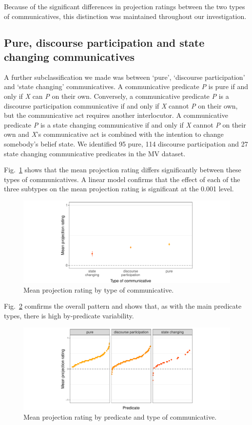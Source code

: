 \documentclass[11pt,fleqn]{article}
\newcommand{\figref}[1]{Fig.~\ref{#1}}
\newcommand{\6}{\mbox{$[\hspace*{-.6mm}[$}}
\newcommand{\9}{\mbox{$]\hspace*{-.6mm}]$}}
\begin{document}
Because of the significant differences in projection ratings between the two types of communicatives, this distinction was maintained throughout our investigation.

\subsection{Pure, discourse participation and state changing communicatives}
A further subclassification we made was between `pure', `discourse participation' and `state changing' communicatives. A communicative predicate \emph{P} is pure if and only if \emph{X} can \emph{P} on their own. Conversely, a communicative predicate \emph{P} is a discourse participation communicative if and only if \emph{X} cannot \emph{P} on their own, but the communicative act requires another interlocutor. A communicative predicate \emph{P} is a state changing communicative if and only if \emph{X} cannot \emph{P} on their own and \emph{X}'s communicative act is combined with the intention to change somebody's belief state. We identified 95 pure, 114 discourse participation and 27 state changing communicative predicates in the MV dataset.

\figref{projcomm} shows that the mean projection rating differs significantly between these types of communicatives. A linear model confirms that the effect of each of the three subtypes on the mean projection rating is significant at the 0.001 level.

\begin{figure}[H]
	\centering
	\includegraphics[width=.9\textwidth]{projection-by-predicateType-commType}
	\caption{Mean projection rating by type of communicative.}
	\label{projcomm}
\end{figure}

\figref{projcommfac} comfirms the overall pattern and shows that, as with the main predicate types, there is high by-predicate variability.

\begin{figure}[H]
	\centering
	\includegraphics[width=.9\textwidth]{projection-by-communicative-predicate}
	\caption{Mean projection rating by predicate and type of communicative.}
	\label{projcommfac}
\end{figure}
\end{document}
